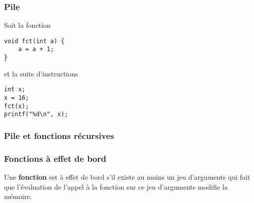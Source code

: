 \begin{frame}[fragile] \frametitle{Pile}
Soit la fonction 
\begin{lstlisting}
void fct(int a) {
    a = a + 1;
}
\end{lstlisting}
et la suite d'instructions
\begin{lstlisting}
int x;
x = 16;
fct(x);
printf("%d\n", x);
\end{lstlisting}

\begin{center}
\end{center}
\end{frame}

\begin{frame}[fragile] \frametitle{Pile et fonctions récursives}
\begin{center}
\end{center}
\end{frame}

\begin{frame}[fragile]\frametitle{Fonctions à effet de bord}
Une {\bf fonction} est à \alert{effet de bord} s'il existe au
moins un jeu d'arguments qui fait que l'évaluation de l'appel
à la fonction sur ce jeu d'arguments modifie la mémoire.
\bigskip

\begin{multicols}{2}
\begin{semiverbatim}
\end{semiverbatim}
\end{multicols}
\medskip

\begin{multicols}{2}
\begin{semiverbatim}
\end{semiverbatim}
\end{multicols}
\end{frame}

